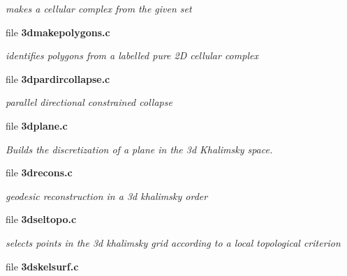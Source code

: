 \begin{DoxyCompactItemize}
\begin{DoxyCompactList}\small\item\em makes a cellular complex from the given set \item\end{DoxyCompactList}

\item 
file {\bf 3dmakepolygons.c}


\begin{DoxyCompactList}\small\item\em identifies polygons from a labelled pure 2D cellular complex \item\end{DoxyCompactList}

\item 
file {\bf 3dpardircollapse.c}


\begin{DoxyCompactList}\small\item\em parallel directional constrained collapse \item\end{DoxyCompactList}

\item 
file {\bf 3dplane.c}


\begin{DoxyCompactList}\small\item\em Builds the discretization of a plane in the 3d Khalimsky space. \item\end{DoxyCompactList}

\item 
file {\bf 3drecons.c}


\begin{DoxyCompactList}\small\item\em geodesic reconstruction in a 3d khalimsky order \item\end{DoxyCompactList}

\item 
file {\bf 3dseltopo.c}


\begin{DoxyCompactList}\small\item\em selects points in the 3d khalimsky grid according to a local topological criterion \item\end{DoxyCompactList}

\item 
file {\bf 3dskelsurf.c}



\end{DoxyCompactItemize}
